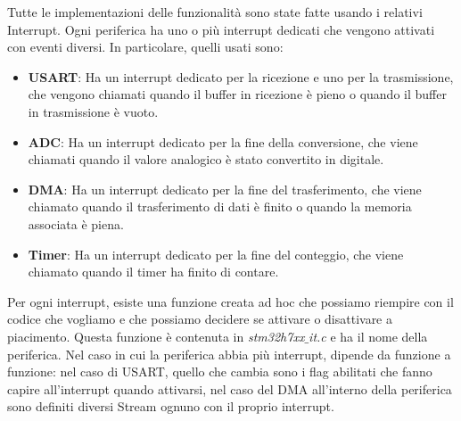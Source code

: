 Tutte le implementazioni delle funzionalità sono state fatte usando i relativi Interrupt.
Ogni periferica ha uno o più interrupt dedicati che vengono attivati con eventi diversi. In particolare, quelli usati sono:
\begin{itemize}
    \item \textbf{USART}: Ha un interrupt dedicato per la ricezione e uno per la trasmissione, che vengono chiamati quando il buffer in ricezione è pieno o quando il buffer in trasmissione è vuoto.
    \item \textbf{ADC}: Ha un interrupt dedicato per la fine della conversione, che viene chiamati quando il valore analogico è stato convertito in digitale.
    \item \textbf{DMA}: Ha un interrupt dedicato per la fine del trasferimento, che viene chiamato quando il trasferimento di dati è finito o quando la memoria associata è piena.
    \item \textbf{Timer}: Ha un interrupt dedicato per la fine del conteggio, che viene chiamato quando il timer ha finito di contare.
\end{itemize}

Per ogni interrupt, esiste una funzione creata ad hoc che possiamo riempire con il codice che vogliamo e che possiamo decidere se attivare o disattivare a piacimento. Questa funzione è contenuta in \textit{stm32h7xx$\_$it.c} e ha il nome della periferica. Nel caso in cui la periferica abbia più interrupt, dipende da funzione a funzione: nel caso di USART, quello che cambia sono i flag abilitati che fanno capire all'interrupt quando attivarsi, nel caso del DMA all'interno della periferica sono definiti diversi Stream ognuno con il proprio interrupt.

